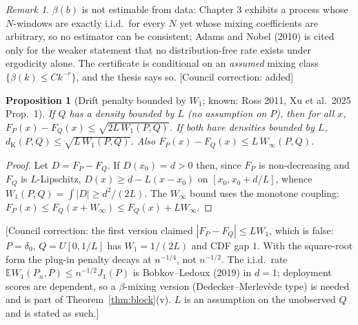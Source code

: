 \documentclass[11pt,a4paper]{article}
\newcommand{\corr}[1]{{\color{ox}\textsf{\small [Council correction: #1]}}}
\theoremstyle{plain}
\newtheorem{proposition}[theorem]{Proposition}
\theoremstyle{definition}
\theoremstyle{remark}
\newtheorem*{remark}{Remark}
\newcommand{\E}{\mathbb{E}}
\newcommand{\dK}{d_{\mathrm{K}}}
\begin{document}
\begin{remark}
$\beta(b)$ is not estimable from data: Chapter 3 exhibits a process whose $N$-windows are exactly i.i.d.\ for every $N$ yet whose mixing coefficients are arbitrary, so no estimator can be consistent; Adams and Nobel (2010) is cited only for the weaker statement that no distribution-free rate exists under ergodicity alone. The certificate is conditional on an \emph{assumed} mixing class $\{\beta(k)\le Ck^{-r}\}$, and the thesis says so. \corr{added}
\end{remark}

\begin{proposition}[Drift penalty bounded by $W_1$; known: Ross 2011, Xu et al.\ 2025 Prop.\ 1]\label{prop:w1}
If $Q$ has a density bounded by $L$ (no assumption on $P$), then for all $x$, $F_P(x)-F_Q(x)\le\sqrt{2L\,W_1(P,Q)}$. If both have densities bounded by $L$, $\dK(P,Q)\le\sqrt{L\,W_1(P,Q)}$. Also $F_P(x)-F_Q(x)\le L\,W_\infty(P,Q)$.
\end{proposition}
\begin{proof}
Let $D=F_P-F_Q$. If $D(x_0)=d>0$ then, since $F_P$ is non-decreasing and $F_Q$ is $L$-Lipschitz, $D(x)\ge d-L(x-x_0)$ on $[x_0,x_0+d/L]$, whence $W_1(P,Q)=\int|D|\ge d^2/(2L)$. The $W_\infty$ bound uses the monotone coupling: $F_P(x)\le F_Q(x+W_\infty)\le F_Q(x)+LW_\infty$.
\end{proof}
\corr{the first version claimed $|F_P-F_Q|\le LW_1$, which is false: $P=\delta_0$, $Q=U[0,1/L]$ has $W_1=1/(2L)$ and CDF gap $1$. With the square-root form the plug-in penalty decays at $n^{-1/4}$, not $n^{-1/2}$. The i.i.d.\ rate $\E W_1(P_n,P)\le n^{-1/2}J_1(P)$ is Bobkov--Ledoux (2019) in $d=1$; deployment scores are dependent, so a $\beta$-mixing version (Dedecker--Merlev\`ede type) is needed and is part of Theorem~\ref{thm:block}(v). $L$ is an assumption on the unobserved $Q$ and is stated as such.}
\end{document}
